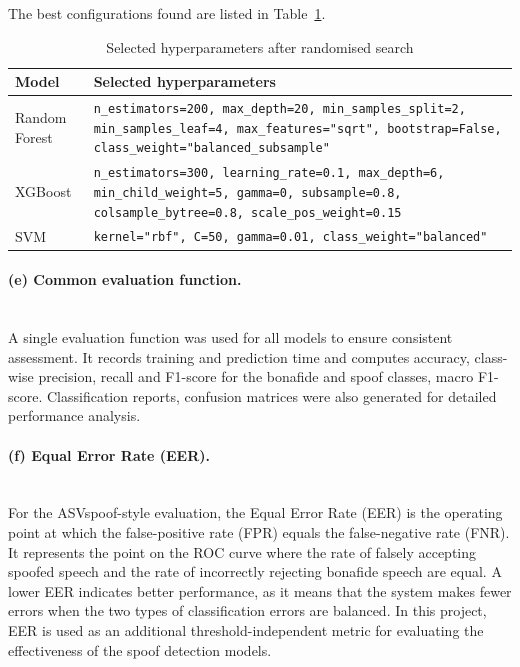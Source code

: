\documentclass[12pt,a4paper]{report}
\begin{document}
The best configurations found are listed in Table~\ref{tab:besthp}.
 
\begin{table}[H]
\centering
\small
\begin{tabular}{lp{11.2cm}}
\toprule
\textbf{Model} & \textbf{Selected hyperparameters}\\
\midrule
Random Forest & \texttt{n\_estimators=200, max\_depth=20, min\_samples\_split=2, min\_samples\_leaf=4, max\_features="sqrt", bootstrap=False, class\_weight="balanced\_subsample"}\\
XGBoost & \texttt{n\_estimators=300, learning\_rate=0.1, max\_depth=6, min\_child\_weight=5, gamma=0, subsample=0.8, colsample\_bytree=0.8, scale\_pos\_weight=0.15}\\
SVM & \texttt{kernel="rbf", C=50, gamma=0.01, class\_weight="balanced"}\\
\bottomrule
\end{tabular}
\caption{Selected hyperparameters after randomised search}
\label{tab:besthp}
\end{table}
 
 
\paragraph{(e) Common evaluation function.}\mbox{}\\
A single evaluation function was used for all models to ensure consistent assessment. It records training and prediction time and computes accuracy, class-wise precision, recall and F1-score for the bonafide and spoof classes, macro F1-score. Classification reports, confusion matrices were also generated for detailed performance analysis.

\paragraph{(f) Equal Error Rate (EER).}\mbox{}\\
For the ASVspoof-style evaluation, the Equal Error Rate (EER) is the operating point at which the false-positive rate (FPR) equals the false-negative rate (FNR). It represents the point on the ROC curve where the rate of falsely accepting spoofed speech and the rate of incorrectly rejecting bonafide speech are equal. A lower EER indicates better performance, as it means that the system makes fewer errors when the two types of classification errors are balanced. In this project, EER is used as an additional threshold-independent metric for evaluating the effectiveness of the spoof detection models.
 
\end{document}
